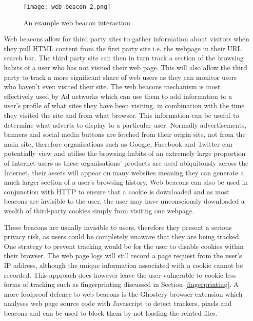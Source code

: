\documentclass[12pt]{article}
\begin{document}
\begin{figure}[H]
    \centering
    \texttt{[image: web\_beacon\_2.png]}
    \caption{An example web beacon interaction}
    \label{fig:web_beacons}
\end{figure}

Web beacons allow for third party sites to gather information about visitors when they pull HTML content from the first party site i.e. the webpage in their URL search bar. The third party site can then in turn track a section of the browsing habits of a user who has not visited their web page. This will also allow the third party to track a more significant share of web users as they can monitor users who haven't even visited their site. The web beacons mechanism is most effectively used by Ad networks which can use them to add information to a user's profile of what sites they have been visiting, in combination with the time they visited the site and from what browser. This information can be useful to determine what adverts to display to a particular user. Normally advertisements, banners and social media buttons are fetched from their origin site, not from the main site, therefore organisations such as Google, Facebook and Twitter can potentially view and utilise the browsing habits of an extremely large proportion of Internet users as these organisations' products are used ubiquitously across the Internet, their assets will appear on many websites meaning they can generate a much larger section of a user's browsing history. Web beacons can also be used in conjunction with HTTP to ensure that a cookie is downloaded and as most beacons are invisible to the user, the user may have unconsciously downloaded a wealth of third-party cookies simply from visiting one webpage. \newline

These beacons are usually invisible to users, therefore they present a serious privacy risk, as users could be completely unaware that they are being tracked. One strategy to prevent tracking would be for the user to disable cookies within their browser. The web page logs will still record a page request from the user's IP address, although the unique information associated with a cookie cannot be recorded. This approach does however leave the user vulnerable to cookie-less forms of tracking such as fingerprinting discussed in Section \ref{fingerprinting}. A more foolproof defence to web beacons is the Ghostery browser extension which analyses web page source code with Javascript to detect trackers, pixels and beacons and can be used to block them by not loading the related files. 
\end{document}
